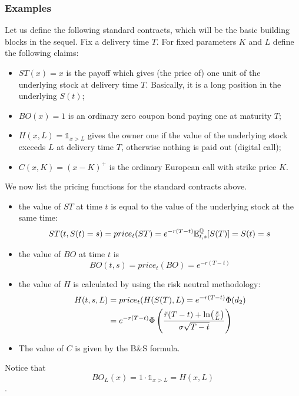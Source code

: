 \subsubsection{Examples}
Let us define the following standard contracts, which will be the basic building blocks in the sequel. Fix a delivery time $T$. For fixed parameters $K$ and $L$ define the following claims:
\begin{itemize}
    \item $ST(x) = x$ is the payoff which gives (the price of) one unit of the underlying stock at delivery time $T$. Basically, it is a long position in the underlying $S(t)$;
    \item $BO(x) = 1$ is an ordinary zero coupon bond paying one at maturity $T$;
    \item $H(x,L) = \mathds{1}_{x>L}$ gives the owner one if the value of the underlying stock exceeds $L$ at delivery time $T$, otherwise nothing is paid out (digital call);
    \item $C(x,K) = (x-K)^+$ is the ordinary European call with strike price $K$.
\end{itemize}
We now list the pricing functions for the standard contracts above.
\begin{itemize}
    \item the value of $ST$ at time $t$ is equal to the value of the 
    underlying stock at the same time:
    \begin{equation}
        ST(t,S(t)=s) = price_t(ST) = e^{-r(T-t)}\mathbb{E}^{\mathbb{Q}}_{t,s}[S(T)] = S(t) = s
    \end{equation}
    \item the value of $BO$ at time $t$ is 
    \begin{equation}
        BO(t,s) = price_t(BO) = e^{-r(T-t)}
    \end{equation}
    \item the value of $H$ is calculated by using the risk neutral methodology:
    \begin{align}
        \notag H(t,s,L) &= price_t(H(S(T),L) = e^{-r(T-t)}\Phi(d_2) \\
        &=
        e^{-r(T-t)}\Phi\left(\frac{\Tilde{r}(T-t) + \ln(\tfrac{s}{L})}{\sigma\sqrt{T-t}}\right)
    \end{align}
    \item The value of $C$ is given by the B\&S formula.
\end{itemize}
Notice that 
$$BO_L(x) = 1\cdot\mathds{1}_{x>L} = H(x,L)$$.